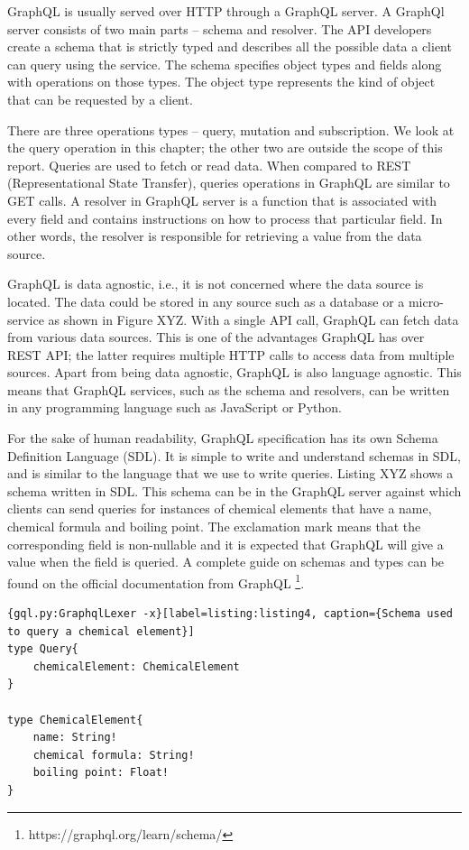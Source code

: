 GraphQL is usually served over HTTP through a GraphQL server. A GraphQl server consists of two main parts – schema and resolver. The API developers create a schema that is strictly typed and describes all the possible data a client can query using the service. The schema specifies object types and fields along with operations on those types. The object type represents the kind of object that can be requested by a client. 

There are three operations types – query, mutation and subscription.  We look at the query operation in this chapter; the other two are outside the scope of this report. Queries are used to fetch or read data. When compared to REST (Representational State Transfer),  queries operations in GraphQL are similar to GET calls. A resolver in GraphQL server is a function that is associated with every field and contains instructions on how to process that particular field. In other words, the resolver is responsible for retrieving a value from the data source. 

GraphQL is data agnostic, i.e., it is not concerned where the data source is located. The data could be stored in any source such as a database or a micro-service as shown in Figure XYZ. With a single API call, GraphQL can fetch data from various data sources. This is one of the advantages GraphQL has over REST API; the latter requires multiple HTTP calls to access data from multiple sources. Apart from being data agnostic, GraphQL is also language agnostic. This means that GraphQL services, such as the schema and resolvers, can be written in any programming language such as JavaScript or Python. 

For the sake of human readability, GraphQL specification has its own Schema Definition Language (SDL). It is simple to write and understand schemas in SDL, and is similar to the language that we use to write queries. Listing XYZ shows a schema written in SDL. This schema can be in the GraphQL server against which clients can send queries for instances of chemical elements that have a name, chemical formula and boiling point. The exclamation mark means that the corresponding field is non-nullable and it is expected that GraphQL will give a value when the field is queried. A complete guide on schemas and types can be found on the official documentation from GraphQL \footnote{https://graphql.org/learn/schema/}. 

\begin{minipage}{\linewidth}
\begin{lstlisting}{gql.py:GraphqlLexer -x}[label=listing:listing4, caption={Schema used to query a chemical element}]
type Query{
	chemicalElement: ChemicalElement
}

type ChemicalElement{
	name: String!
	chemical formula: String!
	boiling point: Float!
}

\end{lstlisting}
\end{minipage}

